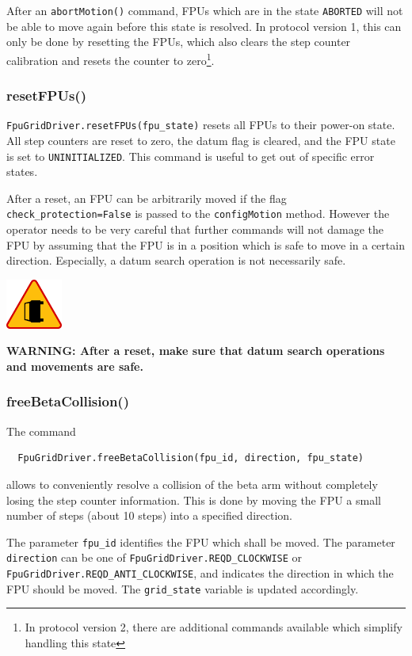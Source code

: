 \documentclass[11pt,a4paper]{report}
\newenvironment{warning}{\begin{framed}\includegraphics[width=5em]{accident-area-ahead.png}
}{\end{framed}}
\begin{document}
After an \texttt{abortMotion()} command, FPUs which are in the state
\texttt{ABORTED} will not be able to move again before this state is
resolved. In protocol version 1, this can only be done by resetting
the FPUs, which also clears the step counter calibration and resets
the counter to zero\footnote{In protocol version 2, there are
  additional commands available which simplify handling this state}.


\subsubsection{resetFPUs()}

\texttt{FpuGridDriver.resetFPUs(fpu\_state)} resets all FPUs to their
power-on state. All step counters are reset to zero, the datum flag is
cleared, and the FPU state is set to \texttt{UNINITIALIZED}. This
command is useful to get out of specific error states. 

After a reset, an FPU can
be arbitrarily moved if the flag \texttt{check\_protection=False} is
passed to the \texttt{configMotion} method. However the operator needs
to be very careful that further commands will not damage the FPU by
assuming that the FPU is in a position which is safe to move in a
certain direction. Especially, a datum search operation is not
necessarily safe.
\begin{warning}
  \textbf{WARNING: After a reset, make sure that datum search
    operations and movements are safe.}
\end{warning}

\subsubsection{freeBetaCollision()}

The command
\begin{verbatim}
  FpuGridDriver.freeBetaCollision(fpu_id, direction, fpu_state)
\end{verbatim}
allows to conveniently resolve a collision
of the beta arm without completely losing the step counter
information. This is done by moving the FPU a small number of steps
(about 10 steps) into a specified direction.

The parameter \texttt{fpu\_id} identifies the FPU which shall be
moved. The parameter \texttt{direction} can be one of
\texttt{FpuGridDriver.REQD\_CLOCKWISE} or
\texttt{FpuGridDriver.REQD\_ANTI\_CLOCKWISE}, and indicates the
direction in which the FPU should be moved. The \texttt{grid\_state}
variable is updated accordingly.
\end{document}
